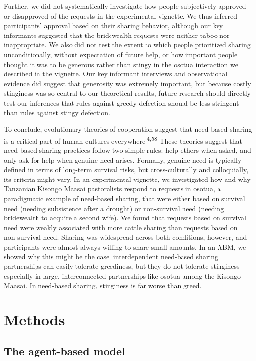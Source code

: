 \documentclass[
]{article}
\begin{document}
Further, we did not systematically investigate how people subjectively approved or disapproved of the requests in the experimental vignette. We thus inferred participants' approval based on their sharing behavior, although our key informants suggested that the bridewealth requests were neither taboo nor inappropriate. We also did not test the extent to which people prioritized sharing unconditionally, without expectation of future help, or how important people thought it was to be generous rather than stingy in the osotua interaction we described in the vignette. Our key informant interviews and observational evidence did suggest that generosity was extremely important, but because costly stinginess was so central to our theoretical results, future research should directly test our inferences that rules against greedy defection should be less stringent than rules against stingy defection.

To conclude, evolutionary theories of cooperation suggest that need-based sharing is a critical part of human cultures everywhere.\textsuperscript{4,58} These theories suggest that need-based sharing practices follow two simple rules: help others when asked, and only ask for help when genuine need arises. Formally, genuine need is typically defined in terms of long-term survival risks, but cross-culturally and colloquially, its criteria might vary. In an experimental vignette, we investigated how and why Tanzanian Kisongo Maasai pastoralists respond to requests in osotua, a paradigmatic example of need-based sharing, that were either based on survival need (needing subsistence after a drought) or non-survival need (needing bridewealth to acquire a second wife). We found that requests based on survival need were weakly associated with more cattle sharing than requests based on non-survival need. Sharing was widespread across both conditions, however, and participants were almost always willing to share small amounts. In an ABM, we showed why this might be the case: interdependent need-based sharing partnerships can easily tolerate greediness, but they do not tolerate stinginess -- especially in large, interconnected partnerships like osotua among the Kisongo Maasai. In need-based sharing, stinginess is far worse than greed.

\section*{Methods}\label{themethods}

\subsection*{The agent-based model}\label{abmmethods}
\end{document}
